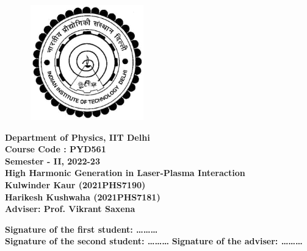 \begin{titlepage}
    \begin{figure}
        \includegraphics[width=5cm, height=5cm]{logo.png}
        \centering
    \end{figure}
    \begin{center}
        \textbf{\Large{Department of Physics, IIT Delhi}}\\
        \vspace*{1cm}
        \textbf{\Large{Course Code : PYD561}}\\
        \vspace*{0.2cm}
        \textbf{\Large {Semester - II, 2022-23}}\\
        \vspace*{1cm}
        \textbf{\LARGE{High Harmonic Generation in Laser-Plasma Interaction}}\\
        \vspace*{1cm}
        \textbf{\Large{Kulwinder Kaur (2021PHS7190)}}\\
        \vspace*{0.2cm}
        \textbf{\Large {Harikesh Kushwaha (2021PHS7181)}}\\
        \vspace*{1cm}
        \textbf{\Large {Adviser: Prof. Vikrant Saxena}}\\
        \vspace*{2cm}
    \end{center}
    \begin{flushleft}
        \textbf{Signature of the first student: \ldots \ldots \ldots}\\
        \vspace*{1cm}
        \textbf{Signature of the second student: \ldots \ldots \ldots}
        \hspace*{2cm}
        \textbf{Signature of the adviser: \ldots \ldots \ldots}
    \end{flushleft}
\end{titlepage}
\newpage